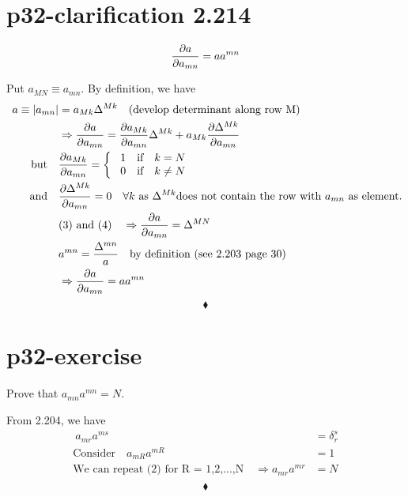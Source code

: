 \section{p32-clarification 2.214}
\begin{tcolorbox}
          $$ \pdv{a}{a_{mn}} = a a^{mn}$$
\end{tcolorbox}
Put $a_{MN}\equiv a_{mn}$. By definition, we have
\begin{align}
\  a\equiv |a_{mn}|  &= a_{Mk}\Delta^{Mk}\quad\text{(develop determinant along row M)}\\
\ &\Rightarrow \pdv{a}{a_{mn}} = \pdv{a_{Mk}}{a_{mn}}\Delta^{Mk} + a_{Mk}\pdv{\Delta^{Mk}}{a_{mn}}\\
\text{but}\quad &\pdv{a_{Mk}}{a_{mn}} = \left\{\begin{array}{c}
\ 1\quad\text{if} \quad k = N\\
\ 0\quad\text{if} \quad k \neq N\\
\end{array}\right.\\
\text{and}\quad &\pdv{\Delta^{Mk}}{a_{mn}} = 0 \quad \forall k \text{ as } \Delta^{Mk} \text{does not contain the row with } a_{mn} \text{ as element.}\\
\ & \text{(3) and (4)}\quad  \Rightarrow \pdv{a}{a_{mn}} = \Delta^{MN}\\ 
\ &  a^{mn} = \frac{\Delta^{mn}}{a}\quad\text{by definition (see 2.203 page 30)}\\
\ & \Rightarrow \pdv{a}{a_{mn}} = aa^{mn}
\end{align} 
$$\blacklozenge$$
\newpage


\section{p32-exercise}
\begin{tcolorbox}
Prove that $a_{mn}a^{mn} = N$.
\end{tcolorbox}
From 2.204, we have
\begin{align}
\ a_{mr}a^{ms} &= \delta^s_r\\
\text{Consider} \quad a_{mR}a^{mR} &= 1\\
\text{We can repeat (2) for R = 1,2,...,N} \quad \Rightarrow a_{mr}a^{mr} &= N\\
\end{align}
$$\blacklozenge$$
\newpage


